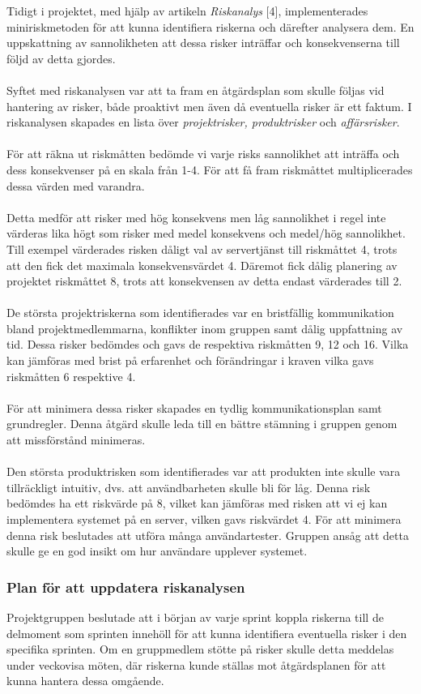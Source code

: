 \documentclass[12pt]{article}
\begin{document}
 Tidigt i projektet, med hjälp av artikeln \textit{Riskanalys} [4], implementerades miniriskmetoden för att kunna identifiera riskerna och därefter analysera dem. En uppskattning av sannolikheten att dessa risker inträffar och konsekvenserna till följd av detta gjordes.\\\\
 Syftet med riskanalysen var att ta fram en åtgärdsplan som skulle följas vid hantering av risker, både proaktivt men även då eventuella risker är ett faktum. I riskanalysen skapades en lista över \textit{projektrisker, produktrisker} och \textit{affärsrisker}.\\\\
 För att räkna ut riskmåtten bedömde vi varje risks sannolikhet att inträffa och dess konsekvenser på en skala från 1-4. För att få fram riskmåttet multiplicerades dessa värden med varandra.\\\\
 Detta medför att risker med hög konsekvens men låg sannolikhet i regel inte värderas lika högt som risker med medel konsekvens och medel/hög sannolikhet. Till exempel värderades risken dåligt val av servertjänst till riskmåttet 4, trots att den fick det maximala konsekvensvärdet 4. Däremot fick dålig planering av
 projektet riskmåttet 8, trots att konsekvensen av detta endast värderades till 2. \\\\
 De största projektriskerna som identifierades var en bristfällig kommunikation bland projektmedlemmarna, konflikter inom gruppen samt dålig uppfattning av tid. Dessa risker bedömdes och gavs de respektiva riskmåtten 9, 12 och 16. Vilka kan jämföras med brist på erfarenhet och förändringar i kraven vilka gavs riskmåtten 6 respektive 4.\\\\ 
 För att minimera dessa risker skapades en tydlig kommunikationsplan samt grundregler. Denna åtgärd skulle leda till en bättre stämning i gruppen genom att missförstånd minimeras.\\\\
 Den största produktrisken som identifierades var att produkten inte skulle vara tillräckligt intuitiv, dvs. att användbarheten skulle bli för låg. Denna risk bedömdes ha ett riskvärde på 8, vilket kan jämföras med risken att vi ej kan implementera systemet på en server, vilken gavs riskvärdet 4. För att minimera denna risk beslutades att utföra många användartester. Gruppen ansåg att detta skulle ge en god insikt om hur användare upplever systemet. \subsubsection{Plan för att uppdatera riskanalysen}
 Projektgruppen beslutade att i början av varje sprint koppla riskerna till de delmoment som sprinten innehöll för att kunna identifiera eventuella risker i den specifika sprinten. Om en gruppmedlem stötte på risker skulle detta meddelas under veckovisa möten, där riskerna kunde ställas mot åtgärdsplanen för att kunna hantera dessa omgående.
\end{document}
